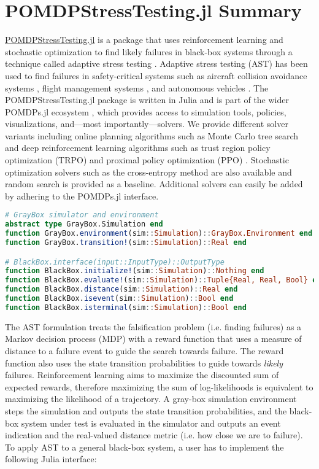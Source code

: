 \section{POMDPStressTesting.jl Summary}

\href{https://github.com/sisl/POMDPStressTesting.jl}{POMDPStressTesting.jl} is a package that uses reinforcement learning and stochastic optimization to find likely failures in black-box systems through a technique called adaptive stress testing \cite{ast}.
Adaptive stress testing (AST) has been used to find failures in safety-critical systems such as aircraft collision avoidance systems \cite{ast_acasx}, flight management systems \cite{ast_fms}, and autonomous vehicles \cite{ast_av}.
The POMDPStressTesting.jl package is written in Julia \cite{julia} and is part of the wider POMDPs.jl ecosystem \cite{pomdps_jl}, which provides access to simulation tools, policies, visualizations, and---most importantly---solvers.
We provide different solver variants including online planning algorithms such as Monte Carlo tree search \cite{mcts} and deep reinforcement learning algorithms such as trust region policy optimization (TRPO) \cite{trpo} and proximal policy optimization (PPO) \cite{ppo}.
Stochastic optimization solvers such as the cross-entropy method \cite{cem} are also available and random search is provided as a baseline.
Additional solvers can easily be added by adhering to the POMDPs.jl interface.

\begin{lstlisting}[language=Julia]
# GrayBox simulator and environment
abstract type GrayBox.Simulation end
function GrayBox.environment(sim::Simulation)::GrayBox.Environment end
function GrayBox.transition!(sim::Simulation)::Real end

# BlackBox.interface(input::InputType)::OutputType
function BlackBox.initialize!(sim::Simulation)::Nothing end
function BlackBox.evaluate!(sim::Simulation)::Tuple{Real, Real, Bool} end
function BlackBox.distance(sim::Simulation)::Real end
function BlackBox.isevent(sim::Simulation)::Bool end
function BlackBox.isterminal(sim::Simulation)::Bool end
\end{lstlisting}

The AST formulation treats the falsification problem (i.e. finding failures) as a Markov decision process (MDP) with a reward function that uses a measure of distance to a failure event to guide the search towards failure.
The reward function also uses the state transition probabilities to guide towards \textit{likely} failures.
Reinforcement learning aims to maximize the discounted sum of expected rewards, therefore maximizing the sum of log-likelihoods is equivalent to maximizing the likelihood of a trajectory.
A gray-box simulation environment steps the simulation and outputs the state transition probabilities, and the black-box system under test is evaluated in the simulator and outputs an event indication and the real-valued distance metric (i.e. how close we are to failure).
To apply AST to a general black-box system, a user has to implement the following Julia interface:


